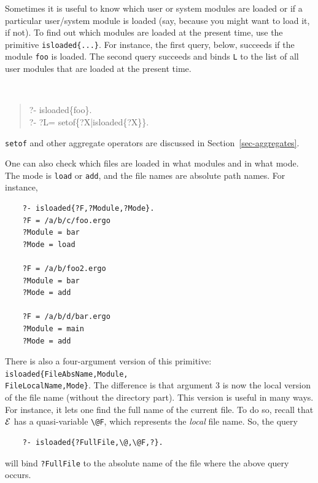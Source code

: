 \documentclass[11pt]{article}
\newcommand{\ERGO}{\mbox{\ensuremath{\cal{E}}\smaller{{\sc{RGO}}}}\xspace}
\newcommand{\FLSYSTEM}{\ERGO}
\newcommand{\bs}{\textbackslash}
\begin{document}
Sometimes it is useful to know which user or system modules are loaded or if a
particular user/system module is loaded (say, because you might want to load it,
if not).  To find out which modules are loaded at the present time, use the
primitive {\tt isloaded\{...\}}. For instance, the first query,
below, succeeds if the module {\tt foo} is loaded. The second query
succeeds and binds {\tt L} to the list of all user modules that are loaded
at the present time.
{\tt
\begin{quote}
 ?- isloaded\{foo\}.\\
 ?- ?L= setof\{?X|isloaded\{?X\}\}.
\end{quote}
}
\texttt{setof} and other aggregate operators are discussed in
Section~\ref{sec-aggregates}.

One can also check which files are loaded in what modules and in what mode.
The mode is \texttt{load} or \texttt{add}, and the file names are absolute
path names. For instance, 
\begin{verbatim}
    ?- isloaded{?F,?Module,?Mode}.
    ?F = /a/b/c/foo.ergo
    ?Module = bar
    ?Mode = load

    ?F = /a/b/foo2.ergo
    ?Module = bar
    ?Mode = add

    ?F = /a/b/d/bar.ergo
    ?Module = main
    ?Mode = add
\end{verbatim}

There is also a four-argument version of this primitive:
\texttt{isloaded\{FileAbsName,Module,\\FileLocalName,Mode\}}. The difference
is that argument 3 is now the local version of the file name (without the
directory part). This version is useful in many ways. For instance, it lets
one find the full name of the current file. To do so, recall that \FLSYSTEM
has a quasi-variable \texttt{\bs{}@F}, which represents the \emph{local}
file name. So, the query
\begin{verbatim}
    ?- isloaded{?FullFile,\@,\@F,?}.
\end{verbatim}
will bind \texttt{?FullFile} to the absolute name of the file where the
above query occurs.
\end{document}

